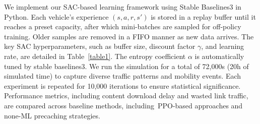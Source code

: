 \documentclass{aims}
\numberwithin{equation}{section}
\begin{document}
We implement our SAC-based learning framework using Stable Baselines3 in Python.
Each vehicle’s experience $(s, a, r, s')$ is stored in a replay buffer until it reaches a preset capacity, after which mini-batches are sampled for off-policy training.
Older samples are removed in a FIFO manner as new data arrives.
The key SAC hyperparameters, such as buffer size, discount factor $\gamma$, and learning rate, are detailed in Table~\ref{table1}.
The entropy coefficient $\alpha$ is automatically tuned by stable baselines3.
We run the simulation for a total of 72,000s (20h of simulated time) to capture diverse traffic patterns and mobility events.
Each experiment is repeated for 10,000 iterations to ensure statistical significance.
Performance metrics, including content download delay and wasted link traffic, are compared across baseline methods, including~PPO-based approaches and none-ML precaching strategies.
\end{document}
